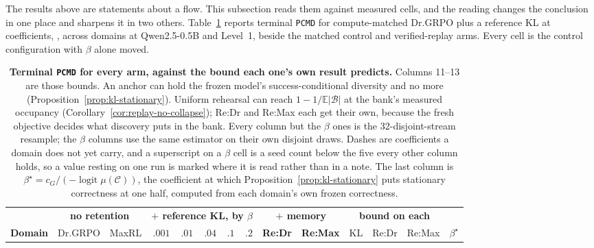 \documentclass{article}
\newcommand{\1}{\mathbf 1}
\newcommand{\E}{\mathbb E}
\newcommand{\pmd}{\texttt{PCMD}}
\theoremstyle{remark}
\theoremstyle{definition}
\theoremstyle{plain}
\begin{document}
The results above are statements about a flow. This subsection reads them
against measured cells, and the reading changes the conclusion in one place and
sharpens it in two others. Table~\ref{tab:reference-kl-measured} reports
terminal \pmd{} for compute-matched Dr.GRPO plus a reference KL at
\MDklBetaCount{} coefficients, \MDklBetaList{}, across \MDklDomains{} domains
at Qwen2.5-0.5B and Level~1, beside the matched control and verified-replay
arms. Every cell is the control configuration with $\beta$ alone moved.

\begin{table}[t]
  \centering
  \caption{\textbf{Terminal \pmd{} for every arm, against the bound each one's
  own result predicts.} Columns 11--13 are those bounds. An anchor can
  hold the frozen model's success-conditional diversity and no more
  (Proposition~\ref{prop:kl-stationary}). Uniform rehearsal can reach
  $1-1/\E|\mathcal B|$ at the bank's measured occupancy
  (Corollary~\ref{cor:replay-no-collapse}); Re:Dr and Re:Max each get their own,
  because the fresh objective decides what discovery puts in the bank. Every
  column but the $\beta$ ones is the 32-disjoint-stream resample; the $\beta$
  columns use the same estimator on their own disjoint draws. Dashes are
  coefficients a domain does not yet carry, and a superscript on a $\beta$ cell
  is a seed count below the five every other column holds, so a value resting
  on one run is marked where it is read rather than in a note. The last column
  is $\beta^\star=c_G/(-\operatorname{logit}\mu(\mathcal C))$, the coefficient
  at which Proposition~\ref{prop:kl-stationary} puts stationary correctness at
  one half, computed from each domain's own frozen correctness.}
  \label{tab:reference-kl-measured}
  \scriptsize
  \setlength{\tabcolsep}{2.9pt}
  \begin{tabular}{@{}lrrrrrrrrrrrrr@{}}
    \toprule
    & \multicolumn{2}{c}{\textbf{no retention}}
      & \multicolumn{5}{c}{\textbf{$+$ reference KL, by $\beta$}}
      & \multicolumn{2}{c}{\textbf{$+$ memory}}
      & \multicolumn{3}{c}{\textbf{bound on each}} & \\
    \cmidrule(lr){2-3}\cmidrule(lr){4-8}\cmidrule(lr){9-10}\cmidrule(lr){11-13}
    \textbf{Domain} & Dr.GRPO & MaxRL
      & $.001$ & $.01$ & $.04$ & $.1$ & $.2$
      & \textbf{Re:Dr} & \textbf{Re:Max}
      & KL & Re:Dr & Re:Max & $\beta^\star$ \\
    \midrule
    
  \end{tabular}
\end{table}
\end{document}
